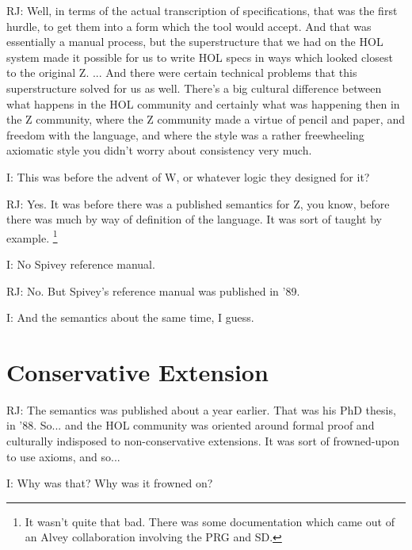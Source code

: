 \documentclass[10pt,titlepage]{book}
\begin{document}
RJ: Well, in terms of the actual transcription of specifications, that was the first hurdle, to get them into a form which the tool would accept.
And that was essentially a manual process, but the superstructure that we had on the HOL system made it possible for us to write HOL specs in ways which looked closest to the original Z.
... 
And there were certain technical problems that this superstructure solved for us as well.
There's a big cultural difference between what happens in the HOL community and certainly what was happening then in the Z community, where the Z community made a virtue of pencil and paper, and freedom with the language, and where the style was a rather freewheeling axiomatic style you didn't worry about consistency very much.

I: This was before the advent of W, or whatever logic they designed for it?

RJ: Yes.
It was before there was a published semantics for Z, you know, before there was much by way of definition of the language.
It was sort of taught by example.%
\footnote{
It wasn't quite that bad.
There was some documentation which came out of an Alvey collaboration involving the PRG and SD.
}

I: No Spivey reference manual.

RJ: No.
But Spivey's reference manual was published in '89.

I: And the semantics about the same time, I guess.

\section{Conservative Extension}

RJ: The semantics was published about a year earlier.
That was his PhD thesis, in '88.
So... and the HOL community was oriented around formal proof and culturally indisposed to non-conservative extensions.
It was sort of frowned-upon to use axioms, and so...

I: Why was that?
Why was it frowned on?
\end{document}

